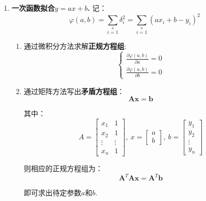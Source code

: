 \begin{enumerate}
\item \textbf{一次函数拟合$y=ax+b$.}
	记：
	\begin{equation}
	\varphi(a,b) =  \sum\limits_{i=1}\limits^{n}\delta_i^2 = \sum\limits_{i=1}\limits^{n}(ax_i+b-y_i)^2
	\end{equation}
	\begin{enumerate}
		\item 通过微积分方法求解\textbf{正规方程组}:
		\begin{equation}
			\begin{cases}
			{\displaystyle \frac{\partial \varphi(a,b)}{\partial a} = 0} \\[3mm]
			{\displaystyle \frac{\partial \varphi(a,b)}{\partial b} = 0}
			\end{cases}
		\end{equation}
	
		\item 通过矩阵方法写出\textbf{矛盾方程组}：
		\begin{equation}
		\boldsymbol{Ax} = \boldsymbol{b}
		\end{equation}
	
		其中：
		$$
		A = \begin{bmatrix}	x_1 & 1 \\ x_2 & 1 \\ \vdots & \vdots\\ x_n & 1 \end{bmatrix},\ 
		x = \begin{bmatrix} a \\ b \end{bmatrix},\ 
		b = \begin{bmatrix}	y_1 \\ y_2 \\ \vdots \\ y_n \end{bmatrix}
		$$
	
		则相应的正规方程组为：
		\begin{equation}
			\boldsymbol{A}^T\boldsymbol{Ax} = \boldsymbol{A}^T\boldsymbol{b}
		\end{equation}
	
		即可求出待定参数$a$和$b$.
	\end{enumerate}


\end{enumerate}

